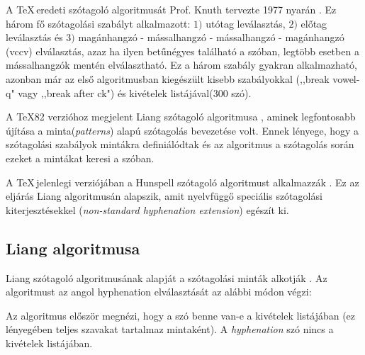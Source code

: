 \documentclass[a4paper, magyar]{article}
\begin{document}
A \TeX\,eredeti szótagoló algoritmusát Prof. Knuth tervezte 1977 nyarán \cite{knuth1979tex}. Ez három fő szótagolási szabályt alkalmazott: $1)$ utótag leválasztás, $2)$ előtag leválasztás és $3)$ magánhangzó - mássalhangzó - mássalhangzó - magánhangzó (vccv) elválasztás, azaz ha ilyen betűnégyes található a szóban, legtöbb esetben a mássalhangzók mentén elválasztható. Ez a három szabály gyakran alkalmazható, azonban már az első algoritmusban kiegészült kisebb szabályokkal (,,break vowel-q" vagy ,,break after ck") és kivételek listájával(300 szó).

A \TeX82 verzióhoz megjelent Liang szótagoló algoritmusa \cite{liang1983word}, aminek legfontosabb újítása a minta(\textit{patterns}) alapú szótagolás bevezetése volt. Ennek lényege, hogy a szótagolási szabályok mintákra definiálódtak és az algoritmus a szótagolás során ezeket a mintákat keresi a szóban.

A \TeX\,jelenlegi verziójában a Hunspell szótagoló algoritmust alkalmazzák \cite{nemeth2006automatic}. Ez az eljárás Liang algoritmusán alapszik, amit nyelvfüggő speciális szótagolási kiterjesztésekkel (\textit{non-standard hyphenation extension}) egészít ki.
\subsection{Liang algoritmusa}
Liang szótagoló algoritmusának alapját a szótagolási minták alkotják \cite{liang1983word}. Az algoritmust az angol 
{\selectfont
	hyphenation%
} elválasztását az alábbi módon végzi:

Az algoritmus először megnézi, hogy a szó benne van-e a kivételek listájában (ez lényegében teljes szavakat tartalmaz mintaként). A \textit{hyphenation} szó nincs a kivételek listájában.
\end{document}
